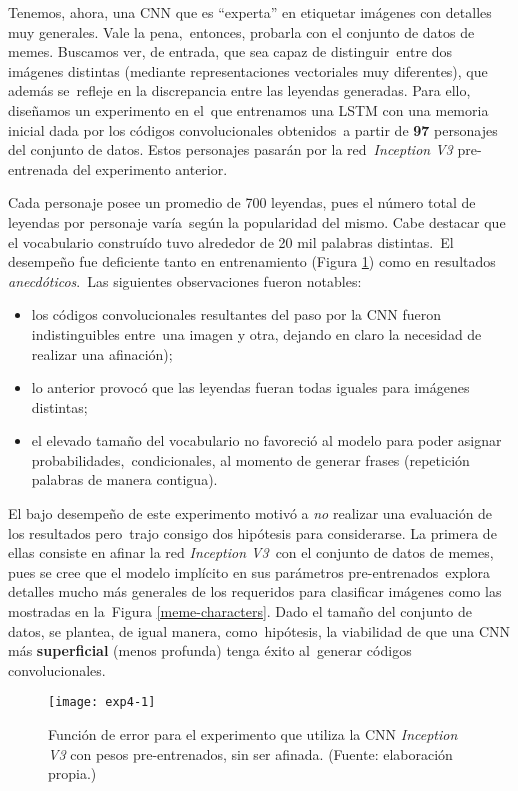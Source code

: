 Tenemos, ahora, una CNN que es ``experta'' en etiquetar imágenes con detalles muy generales. Vale la pena,\
entonces, probarla con el conjunto de datos de memes. Buscamos ver, de entrada, que sea capaz de distinguir\
entre dos imágenes distintas (mediante representaciones vectoriales muy diferentes), que además se\
refleje en la discrepancia entre las leyendas generadas. Para ello, diseñamos un experimento en el\
que entrenamos una LSTM con una memoria inicial dada por los códigos convolucionales obtenidos\
a partir de \textbf{97} personajes del conjunto de datos. Estos personajes pasarán por la red\
\emph{Inception V3} pre-entrenada del experimento anterior.\par
Cada personaje posee un promedio de 700 leyendas, pues el número total de leyendas por personaje varía\
según la popularidad del mismo. Cabe destacar que el vocabulario construído tuvo alrededor de 20 mil palabras distintas.\
El desempeño fue deficiente tanto en entrenamiento (Figura \ref{exp4}) como en resultados \emph{anecdóticos}.\
Las siguientes observaciones fueron notables:
\begin{itemize}
\item los códigos convolucionales resultantes del paso por la CNN fueron indistinguibles entre\
  una imagen y otra, dejando en claro la necesidad de realizar una afinación);
\item lo anterior provocó que las leyendas fueran todas iguales para imágenes distintas;
\item el elevado tamaño del vocabulario no favoreció al modelo para poder asignar probabilidades,\
  condicionales, al momento de generar frases (repetición palabras de manera contigua).
\end{itemize}\par
El bajo desempeño de este experimento motivó a \emph{no} realizar una evaluación de los resultados pero\
trajo consigo dos hipótesis para considerarse. La primera de ellas consiste en afinar la red \emph{Inception V3}\
con el conjunto de datos de memes, pues se cree que el modelo implícito en sus parámetros pre-entrenados\
explora detalles mucho más generales de los requeridos para clasificar imágenes como las mostradas en la\
Figura \ref{meme-characters}. Dado el tamaño del conjunto de datos, se plantea, de igual manera, como\
hipótesis, la viabilidad de que una CNN más \textbf{superficial} (menos profunda) tenga éxito al\
generar códigos convolucionales.

\begin{figure}[h]
  \texttt{[image: exp4-1]}
  \caption{
    Función de error para el experimento que utiliza la CNN \emph{Inception V3}
    con pesos pre-entrenados, sin ser afinada.
    (Fuente: elaboración propia.)
  }
  \label{exp4}
\end{figure}

